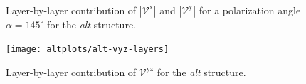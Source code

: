 \documentclass[prb,11pt,tightenlines,twocolumn,aps]{revtex4-1}
\begin{document}
\begin{figure}[tb]
    \centering
    \\
    \caption{Layer-by-layer contribution of $|\mathcal{V}^{\mathrm{x}}|$ and
    $|\mathcal{V}^{\mathrm{y}}|$ for a polarization angle $\alpha=145^{\circ}$
    for the \emph{alt} structure.}
    \label{fig:alt-vab-lay}
\end{figure}
\begin{figure}[tb]
    \centering
    \texttt{[image: altplots/alt-vyz-layers]}
    \caption{Layer-by-layer contribution of $\mathcal{V}^{\mathrm{yz}}$ for the
     \emph{alt} structure.}
    \label{fig:alt-vyz-lay}
\end{figure}
\end{document}
